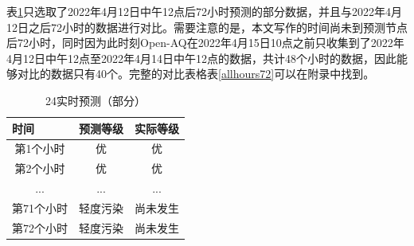 \documentclass[UTF8]{ctexart}
\begin{document}
表\ref{hours72}只选取了2022年4月12日中午12点后72小时预测的部分数据，并且与2022年4月12日之后72小时的数据进行对比。需要注意的是，本文写作的时间尚未到预测节点后72小时，同时因为此时刻Open-AQ在2022年4月15日10点之前只收集到了2022年4月12日中午12点至2022年4月14日中午12点的数据，共计48个小时的数据，因此能够对比的数据只有40个。完整的对比表格表\ref{allhours72}可以在附录中找到。

\begin{table}[H]
    \centering
    \begin{tabular}{|c|c|clll|}
    \hline
    \multicolumn{1}{|l|}{时间} & \multicolumn{1}{l|}{预测等级} & \multicolumn{4}{l|}{实际等级} \\ \hline
    第1个小时                     & 优                         & \multicolumn{4}{c|}{优}    \\ \hline
    第2个小时                     & 优                         & \multicolumn{4}{c|}{优}    \\ \hline
    ...                     & ...                         & \multicolumn{4}{c|}{...}    \\ \hline
    第71个小时                     & 轻度污染                         & \multicolumn{4}{c|}{尚未发生}    \\ \hline
    第72个小时                    & 轻度污染                         & \multicolumn{4}{c|}{尚未发生}    \\ \hline
    \end{tabular}
    \caption{24实时预测（部分）}
    \label{hours72}
\end{table}


\end{document}
